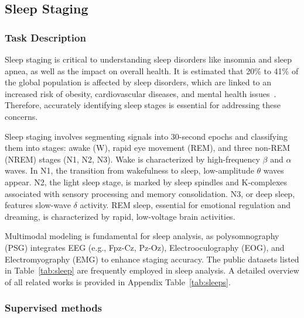 \subsection{Sleep Staging}

\subsubsection{Task Description}
Sleep staging is critical to understanding sleep disorders like insomnia and sleep apnea, as well as the impact on overall health.
It is estimated that 20\% to 41\% of the global population is affected by sleep disorders, which are linked to an increased risk of obesity, cardiovascular diseases, and mental health issues~\cite{recoveryvillage_sleep_statistics_2023}. 
Therefore, accurately identifying sleep stages is essential for addressing these concerns.

Sleep staging involves segmenting signals into 30-second epochs and classifying them into stages: awake (W), rapid eye movement (REM), and three non-REM (NREM) stages (N1, N2, N3).
Wake is characterized by high-frequency $\beta$ and $\alpha$ waves. In N1, the transition from wakefulness to sleep, low-amplitude $\theta$ waves appear. N2, the light sleep stage, is marked by sleep spindles and K-complexes associated with sensory processing and memory consolidation. N3, or deep sleep, features slow-wave $\delta$ activity. REM sleep, essential for emotional regulation and dreaming, is characterized by rapid, low-voltage brain activities.

Multimodal modeling is fundamental for sleep analysis, as polysomnography (PSG) integrates EEG (e.g., Fpz-Cz, Pz-Oz), Electrooculography (EOG), and Electromyography (EMG) to enhance staging accuracy.
The public datasets listed in Table~\ref{tab:sleep} are frequently employed in sleep analysis. 
A detailed overview of all related works is provided in Appendix Table~\ref{tab:sleeps}.



\subsubsection{Supervised methods}

